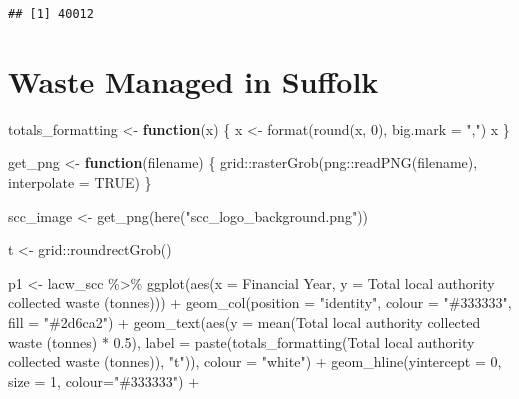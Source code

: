 \documentclass[
]{article}
\newenvironment{Shaded}{\begin{snugshade}}{\end{snugshade}}
\newcommand{\AttributeTok}[1]{\textcolor[rgb]{0.77,0.63,0.00}{#1}}
\newcommand{\ConstantTok}[1]{\textcolor[rgb]{0.00,0.00,0.00}{#1}}
\newcommand{\ControlFlowTok}[1]{\textcolor[rgb]{0.13,0.29,0.53}{\textbf{#1}}}
\newcommand{\DecValTok}[1]{\textcolor[rgb]{0.00,0.00,0.81}{#1}}
\newcommand{\FloatTok}[1]{\textcolor[rgb]{0.00,0.00,0.81}{#1}}
\newcommand{\FunctionTok}[1]{\textcolor[rgb]{0.00,0.00,0.00}{#1}}
\newcommand{\NormalTok}[1]{#1}
\newcommand{\OtherTok}[1]{\textcolor[rgb]{0.56,0.35,0.01}{#1}}
\newcommand{\SpecialCharTok}[1]{\textcolor[rgb]{0.00,0.00,0.00}{#1}}
\newcommand{\StringTok}[1]{\textcolor[rgb]{0.31,0.60,0.02}{#1}}
\begin{document}
\begin{verbatim}
## [1] 40012
\end{verbatim}

\hypertarget{waste-managed-in-suffolk}{%
\section{Waste Managed in Suffolk}\label{waste-managed-in-suffolk}}

\begin{Shaded}
\begin{Highlighting}[]
\NormalTok{totals\_formatting }\OtherTok{\textless{}{-}} \ControlFlowTok{function}\NormalTok{(x) \{}
\NormalTok{    x }\OtherTok{\textless{}{-}} \FunctionTok{format}\NormalTok{(}\FunctionTok{round}\NormalTok{(x, }\DecValTok{0}\NormalTok{), }\AttributeTok{big.mark =} \StringTok{","}\NormalTok{)}
\NormalTok{    x}
\NormalTok{\}}

\NormalTok{get\_png }\OtherTok{\textless{}{-}} \ControlFlowTok{function}\NormalTok{(filename) \{}
\NormalTok{  grid}\SpecialCharTok{::}\FunctionTok{rasterGrob}\NormalTok{(png}\SpecialCharTok{::}\FunctionTok{readPNG}\NormalTok{(filename), }\AttributeTok{interpolate =} \ConstantTok{TRUE}\NormalTok{)}
\NormalTok{\}}

\NormalTok{scc\_image }\OtherTok{\textless{}{-}} \FunctionTok{get\_png}\NormalTok{(}\FunctionTok{here}\NormalTok{(}\StringTok{"scc\_logo\_background.png"}\NormalTok{))}

\NormalTok{t }\OtherTok{\textless{}{-}}\NormalTok{ grid}\SpecialCharTok{::}\FunctionTok{roundrectGrob}\NormalTok{()}

\NormalTok{p1 }\OtherTok{\textless{}{-}}\NormalTok{ lacw\_scc }\SpecialCharTok{\%\textgreater{}\%}
    \FunctionTok{ggplot}\NormalTok{(}\FunctionTok{aes}\NormalTok{(}\AttributeTok{x =} \StringTok{\textasciigrave{}}\AttributeTok{Financial Year}\StringTok{\textasciigrave{}}\NormalTok{, }\AttributeTok{y =} \StringTok{\textasciigrave{}}\AttributeTok{Total local authority collected waste (tonnes)}\StringTok{\textasciigrave{}}\NormalTok{)) }\SpecialCharTok{+}
    \FunctionTok{geom\_col}\NormalTok{(}\AttributeTok{position =} \StringTok{"identity"}\NormalTok{, }\AttributeTok{colour =} \StringTok{"\#333333"}\NormalTok{, }\AttributeTok{fill =} \StringTok{"\#2d6ca2"}\NormalTok{) }\SpecialCharTok{+}
    \FunctionTok{geom\_text}\NormalTok{(}\FunctionTok{aes}\NormalTok{(}\AttributeTok{y =} \FunctionTok{mean}\NormalTok{(}\StringTok{\textasciigrave{}}\AttributeTok{Total local authority collected waste (tonnes)}\StringTok{\textasciigrave{}} \SpecialCharTok{*} \FloatTok{0.5}\NormalTok{),}
        \AttributeTok{label =} \FunctionTok{paste}\NormalTok{(}\FunctionTok{totals\_formatting}\NormalTok{(}\StringTok{\textasciigrave{}}\AttributeTok{Total local authority collected waste (tonnes)}\StringTok{\textasciigrave{}}\NormalTok{), }\StringTok{"t"}\NormalTok{)), }
        \AttributeTok{colour =} \StringTok{"white"}\NormalTok{) }\SpecialCharTok{+}
    \FunctionTok{geom\_hline}\NormalTok{(}\AttributeTok{yintercept =} \DecValTok{0}\NormalTok{, }\AttributeTok{size =} \DecValTok{1}\NormalTok{, }\AttributeTok{colour=}\StringTok{"\#333333"}\NormalTok{) }\SpecialCharTok{+}
    

\end{Highlighting}
\end{Shaded}
\end{document}
